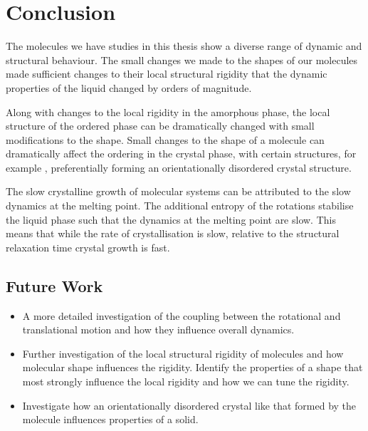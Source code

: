 \chapter{Conclusion}

The molecules we have studies in this thesis show a diverse range of dynamic and structural behaviour. The small changes we made to the shapes of our molecules made sufficient changes to their local structural rigidity that the dynamic properties of the liquid changed by orders of magnitude.

Along with changes to the local rigidity in the amorphous phase, the local structure of the ordered phase can be dramatically changed with small modifications to the shape. Small changes to the shape of a molecule can dramatically affect the ordering in the crystal phase, with certain structures, for example \dcon, preferentially forming an orientationally disordered crystal structure.

The slow crystalline growth of molecular systems can be attributed to the slow dynamics at the melting point. The additional entropy of the rotations stabilise the liquid phase such that the dynamics at the melting point are slow. This means that while the rate of crystallisation is slow, relative to the structural relaxation time crystal growth is fast.

\section{Future Work}

\begin{itemize}
    \item A more detailed investigation of the coupling between the rotational and translational motion and how they influence overall dynamics.
    \item Further investigation of the local structural rigidity of molecules and how molecular shape influences the rigidity. Identify the properties of a shape that most strongly influence the local rigidity and how we can tune the rigidity.
    \item Investigate how an orientationally disordered crystal like that formed by the \dcon molecule influences properties of a solid.
\end{itemize}
